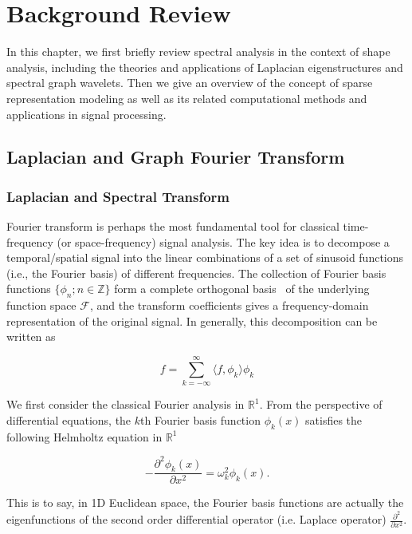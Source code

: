 \chapter{Background Review}
In this chapter, we first briefly review spectral analysis in the context of 
shape analysis, including the theories and applications of Laplacian 
eigenstructures and spectral graph wavelets. Then we give an overview of the 
concept of sparse representation modeling as well as its related computational 
methods and applications in signal processing.

\section{Laplacian and Graph Fourier Transform}

\subsection*{Laplacian and Spectral Transform}
Fourier transform is perhaps the most fundamental tool for classical 
time-frequency (or space-frequency) signal analysis. The key idea is to decompose 
a temporal/spatial signal into the linear combinations of a set of sinusoid 
functions (i.e., the Fourier basis) of different frequencies. The collection of 
Fourier basis functions $\{\phi_n;n\in \mathbb{Z}\}$ form a complete orthogonal 
basis~\cite{Gomes:1999} of the underlying function space $\mathcal{F}$, and the 
transform coefficients gives a frequency-domain representation of the original
signal. In generally, this decomposition can be written as

\begin{equation}
f=\sum_{k=-\infty}^\infty \langle f,\phi_k\rangle\phi_k
\end{equation}

We first consider the classical Fourier analysis in $\mathbb{R}^1$. From the 
perspective of differential equations, the $k$th Fourier basis function 
$\phi_k(x)$ satisfies the following Helmholtz equation in $\mathbb{R}^1$

\begin{equation}\label{eq:Helmholtz1D}
-\frac{\partial^2 \phi_k(x)}{\partial x^2}=\omega_k^2 \phi_k(x).
\end{equation}

This is to say, in 1D Euclidean space, the Fourier basis functions are actually 
the eigenfunctions of the second order differential operator (i.e. Laplace operator)
$\frac{\partial^2}{\partial x^2}$.

